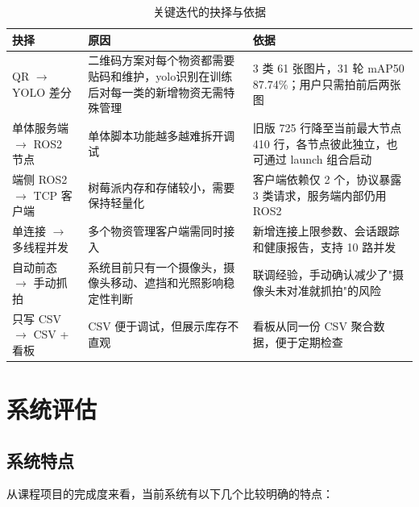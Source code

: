 \documentclass[12pt]{article}
\begin{document}
\begin{table}[H]
	\centering
	\caption{关键迭代的抉择与依据}
	\label{tab:choices}
	\small
	\begin{tabularx}{\textwidth}{M{3.0cm}Y Y}
		\toprule
		抉择                               & 原因                                                     & 依据                                                             \\
		\midrule
		QR $\rightarrow$ YOLO 差分         & 二维码方案对每个物资都需要贴码和维护，yolo识别在训练后对每一类的新增物资无需特殊管理 & 3 类 61 张图片，31 轮 mAP50 87.74\%；用户只需拍前后两张图        \\
		单体服务端 $\rightarrow$ ROS2 节点 & 单体脚本功能越多越难拆开调试                             & 旧版 725 行降至当前最大节点 410 行，各节点彼此独立，也可通过 launch 组合启动 \\
		端侧 ROS2 $\rightarrow$ TCP 客户端 & 树莓派内存和存储较小，需要保持轻量化             & 客户端依赖仅 2 个，协议暴露 3 类请求，服务端内部仍用 ROS2        \\
		单连接 $\rightarrow$ 多线程并发    & 多个物资管理客户端需同时接入                               & 新增连接上限参数、会话跟踪和健康报告，支持 10 路并发             \\
		自动前态 $\rightarrow$ 手动抓拍    & 系统目前只有一个摄像头，摄像头移动、遮挡和光照影响稳定性判断                     & 联调经验，手动确认减少了"摄像头未对准就抓拍"的风险               \\
		只写 CSV $\rightarrow$ CSV + 看板  & CSV 便于调试，但展示库存不直观                           & 看板从同一份 CSV 聚合数据，便于定期检查                    \\
		\bottomrule
	\end{tabularx}
\end{table}

\section{系统评估}

\subsection{系统特点}

从课程项目的完成度来看，当前系统有以下几个比较明确的特点：
\end{document}
